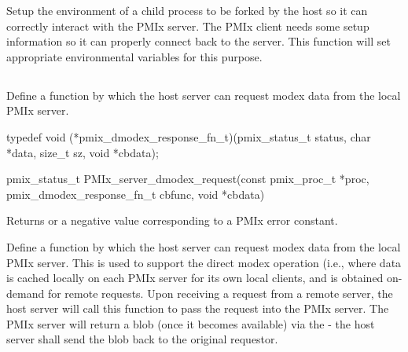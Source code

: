 \descr

Setup the environment of a child process to be forked by the host so it can correctly interact with the PMIx server.
The PMIx client needs some setup information so it can properly connect back to the server.
This function will set appropriate environmental variables for this purpose.


\subsection{}

\summary

Define a function by which the host server can request modex data from the local PMIx server.

\format

\cspecificstart
\begin{codepar}
typedef void (*pmix_dmodex_response_fn_t)(pmix_status_t status,
                                          char *data, size_t sz,
                                          void *cbdata);

pmix_status_t PMIx_server_dmodex_request(const pmix_proc_t *proc,
                                         pmix_dmodex_response_fn_t cbfunc,
                                         void *cbdata)
\end{codepar}
\cspecificend

\begin{arglist}
\end{arglist}

Returns  or a negative value corresponding to a PMIx error constant.

\descr

Define a function by which the host server can request modex data from the local PMIx server.
This is used to support the direct modex operation (i.e., where data is cached locally on each PMIx server for its own local clients, and is obtained on-demand for remote requests.
Upon receiving a request from a remote server, the host server will call this function to pass the request into the PMIx server.
The PMIx server will return a blob (once it becomes available) via the  - the host server shall send the blob back to the original requestor.

